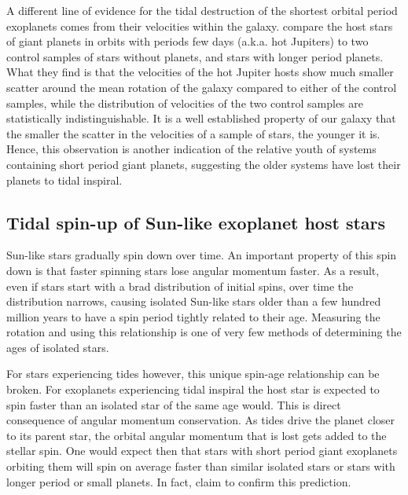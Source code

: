 A different line of evidence for the tidal destruction of the shortest orbital
period exoplanets comes from their velocities within the galaxy.
\citet{Hamer_Schlaufman_19} compare the host stars of giant planets in orbits
with periods few days (a.k.a.  hot Jupiters) to two control samples of stars
without planets, and stars with longer period planets. What they find is that
the velocities of the hot Jupiter hosts show much smaller scatter around the
mean rotation of the galaxy compared to either of the control samples, while the
distribution of velocities of the two control samples are statistically
indistinguishable. It is a well established property of our galaxy that the
smaller the scatter in the velocities of a sample of stars, the younger it is.
Hence, this observation is another indication of the relative youth of systems
containing short period giant planets, suggesting the older systems have lost
their planets to tidal inspiral.

\subsection{Tidal spin-up of Sun-like exoplanet host stars}

Sun-like stars gradually spin down over time. An important property of this spin
down is that faster spinning stars lose angular momentum faster. As a result,
even if stars start with a brad distribution of initial spins, over time the
distribution narrows, causing isolated Sun-like stars older than a few hundred
million years to have a spin period tightly related to their age. Measuring the
rotation and using this relationship is one of very few methods of determining
the ages of isolated stars.

For stars experiencing tides however, this unique spin-age relationship can be
broken. For exoplanets experiencing tidal inspiral the host star is expected to
spin faster than an isolated star of the same age would. This is direct
consequence of angular momentum conservation. As tides drive the planet closer
to its parent star, the orbital angular momentum that is lost gets added to the
stellar spin. One would expect then that stars with short period giant
exoplanets orbiting them will spin on average faster than similar isolated stars
or stars with longer period or small planets. In fact, \citet{Tajeda_et_al_21}
claim to confirm this prediction.

